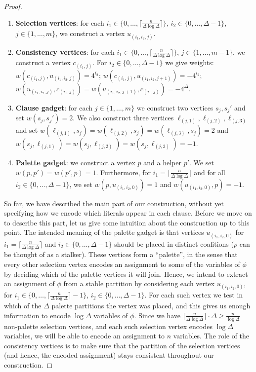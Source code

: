 \documentclass[letterpaper,USenglish,cleveref, autoref, thm-restate]{lipics-v2021}
\begin{document}
\begin{proof}
\begin{enumerate}
\item \textbf{Selection vertices}: for each $i_1\in \{0,\ldots,\lceil
\frac{n}{\Delta\log\Delta}\rceil\}$, $i_2\in\{0,\ldots,\Delta-1\}$,
$j\in\{1,\ldots,m\}$, we construct a vertex $u_{(i_1,i_2,j)}$.

\item \textbf{Consistency vertices}: for each
$i_1\in\{0,\ldots,\lceil\frac{n}{\Delta\log\Delta}\rceil\}$,
$j\in\{1,\ldots,m-1\}$, we construct a vertex $c_{(i_1,j)}$. For
$i_2\in\{0,\ldots,\Delta-1\}$ we give weights: $w(c_{(i_1,j)},u_{(i_1,i_2,j)})
= 4^{i_2}$; $w(c_{(i_1,j)},u_{(i_1,i_2,j+1)}) = -4^{i_2}$;
$w(u_{(i_1,i_2,j)},c_{(i_1,j)}) = w(u_{(i_1,i_2,j+1)},c_{(i_1,j)}) =
-4^{\Delta}$.

\item \textbf{Clause gadget}: for each $j\in\{1,\ldots,m\}$ we construct two
vertices $s_j, s_j'$ and set $w(s_j,s_j')=2$. We also construct three vertices
$\ell_{(j,1)}, \ell_{(j,2)}, \ell_{(j,3)}$ and set $w(\ell_{(j,1)},s_j) =
w(\ell_{(j,2)},s_j)=w(\ell_{(j,3)},s_j)=2$ and
$w(s_j,\ell_{(j,1)})=w(s_j,\ell_{(j,2)})=w(s_j,\ell_{(j,3)})=-1$. 

\item \textbf{Palette gadget}: we construct a vertex $p$ and a helper $p'$. We
set $w(p,p')=w(p',p)=1$. Furthermore, for
$i_1=\lceil\frac{n}{\Delta\log\Delta}\rceil$ and for all $i_2\in
\{0,\ldots,\Delta-1\}$, we set $w(p,u_{(i_1,i_2,0)})=1$ and
$w(u_{(i_1,i_2,0)},p)=-1$.

\end{enumerate}

So far, we have described the main part of our construction, without yet
specifying how we encode which literals appear in each clause. Before we move
on to describe this part, let us give some intuition about the construction up
to this point. The intended meaning of the palette gadget is that vertices
$u_{(i_1,i_2,0)}$ for $i_1=\lceil\frac{n}{\Delta\log\Delta}\rceil$ and $i_2\in
\{0,\ldots,\Delta-1\}$ should be placed in distinct coalitions ($p$ can be
thought of as a stalker).  These vertices form a ``palette'', in the sense that
every other selection vertex encodes an assignment to some of the variables of
$\phi$ by deciding which of the palette vertices it will join. Hence, we intend
to extract an assignment of $\phi$ from a stable partition by considering each
vertex $u_{(i_1,i_2,0)}$, for $i_1\in \{0,\ldots, \lceil
\frac{n}{\Delta\log\Delta}\rceil-1\}$, $i_2\in \{0,\ldots,\Delta-1\}$.  For
each such vertex we test in which of the $\Delta$ palette partitions the vertex
was placed, and this gives us enough information to encode $\log\Delta$
variables of $\phi$.  Since we have $\lceil\frac{n}{\Delta\log\Delta}\rceil
\cdot \Delta \ge \frac{n}{\log\Delta}$ non-palette selection vertices, and each
such selection vertex encodes $\log\Delta$ variables, we will be able to encode
an assignment to $n$ variables. The role of the consistency vertices is to make
sure that the partition of the selection vertices (and hence, the encoded
assignment) stays consistent throughout our construction.


\end{proof}
\end{document}
